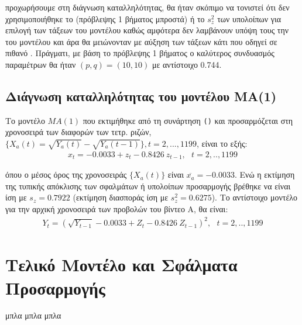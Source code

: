  προχωρήσουμε στη διάγνωση καταλληλότητας, θα ήταν σκόπιμο να τονιστεί ότι δεν χρησιμοποιήθηκε το  (πρόβλεψης 1 βήματος μπροστά) ή το $s_z^2$ των υπολοίπων για επιλογή των τάξεων του μοντέλου καθώς αμφότερα δεν λαμβάνουν υπόψη τους την  του μοντέλου και άρα θα μειώνονταν με αύξηση των τάξεων κάτι που οδηγεί σε πιθανό . Πράγματι, με βάση το  πρόβλεψης 1 βήματος ο καλύτερος συνδυασμός παραμέτρων θα ήταν $(p,q) = (10,10)$ με αντίστοιχο  0.744.

\subsection{Διάγνωση καταλληλότητας του μοντέλου MA(1)}
Το μοντέλο $MA(1)$ που εκτιμήθηκε από τη συνάρτηση \texttt{()} και προσαρμόζεται στη χρονοσειρά των διαφορών των τετρ. ριζών, $\{X_a(t) = \sqrt{Y_a(t)} - \sqrt{Y_a(t-1)}\}, t=2,...,1199$, είναι το εξής:
\begin{align}
x_t = -0.0033 + z_t - 0.8426 \  z_{t-1}, \ \ \  t=2,..,1199
\end{align}

όπου ο μέσος όρος της χρονοσειράς $\{X_a(t)\}$ είναι $\overline{x_a}=-0.0033$. Ενώ η εκτίμηση της τυπικής απόκλισης των σφαλμάτων ή υπολοίπων προσαρμογής βρέθηκε να είναι ίση με \textbf{$s_z = 0.7922$} (εκτίμηση διασποράς ίση με $s_z^2 = 0.6275$). Το αντίστοιχο μοντέλο για την αρχική χρονοσειρά των προβολών του βίντεο Α, θα είναι:
\begin{align}
Y_t = \left(\sqrt{Y_{t-1}} -0.0033 + Z_t - 0.8426 \ Z_{t-1} \right)^2, \ \ \  t=2,..,1199
\end{align}




\section{Τελικό Μοντέλο και Σφάλματα Προσαρμογής}

μπλα μπλα μπλα
